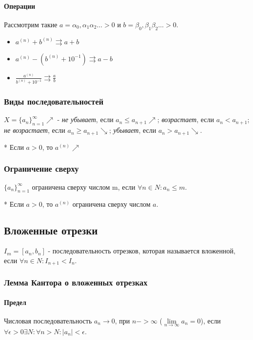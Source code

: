 \documentclass[10pt]{article}
\begin{document}
			\paragraph{Операции}
			Рассмотрим такие $a = \alpha_0,\alpha_1\alpha_2\dots > 0$ и $b = \beta_0,\beta_1\beta_2\dots > 0$.\\
			\begin{itemize}
				\item $a^{(n)} + b^{(n)} \rightrightarrows a + b$
				\item $a^{(n)} - (b^{(n)} + 10^{-1}) \rightrightarrows a - b$
				\item $\frac{a^{(n)}}{b^{(n)} + 10^{-1}} \rightrightarrows \frac{a}{b}$
			\end{itemize}
			
			\subsubsection{Виды последовательностей}
			$X = \{a_n\}_{n=1}^\infty \nearrow$ - \textit{не убывает}, если $a_n \le a_{n+1} \nearrow$; \textit{возрастает}, если $a_n < a_{n+1}$;  \textit{не возрастает}, если $a_n \geq a_{n+1}\searrow$; \textit{убывает}, если $a_n > a_{n+1} \searrow$.
			
			* Если $a > 0$, то $a^{(n)} \nearrow$ 
			\subsubsection{Ограничение сверху}
			$\{a_n\}_{n=1}^\infty$ ограничена сверху числом m, если $\forall n \in N : a_n \le m$.
			
			* Если $a > 0$, то $a^{(n)}$ ограничена сверху числом $a$.
		
		\subsection{Вложенные отрезки}
		$I_m = [a_n, b_n]$ - последовательность отрезков, которая называется вложенной, если $\forall n \in N : I_{n+1} < I_n$.
		
			\subsubsection{Лемма Кантора о вложенных отрезках}
			\paragraph{Предел}
			Числовая последовательность $a_n \to 0$, при $n -> \infty$ ($\lim\limits_{n\to\infty} a_n = 0$), если $\forall \epsilon > 0 \exists N : \forall n > N : |a_n| < \epsilon$.	
					
\end{document}
